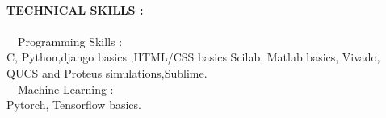 \documentclass[1pt]{article}
\begin{document}
\begin{flushleft}
		\hspace{1cm}\\ \hspace{1cm}
		
		{\small \textbf{TECHNICAL SKILLS :}}\\ \ \\
		\textbullet \ \  Programming Skills :  \\ \hspace{1.4cm}C, Python,django basics ,HTML/CSS basics Scilab, Matlab basics, Vivado, QUCS and Proteus simulations,Sublime.\\
		
		\textbullet \ \ Machine Learning :  \\ \hspace{1.4cm}Pytorch, Tensorflow basics.\\
		
		
			
	\end{flushleft}
	
\end{document}
